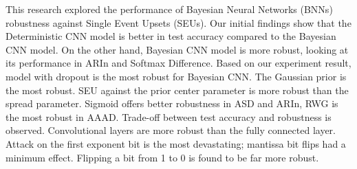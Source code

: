 






This research explored the performance of Bayesian Neural Networks (BNNs) robustness against Single Event Upsets (SEUs). Our initial findings show that the Deterministic CNN model is better in test accuracy compared to the Bayesian CNN model. On the other hand, Bayesian CNN model is more robust, looking at its performance in ARIn and Softmax Difference. Based on our experiment result, model with dropout is the most robust for Bayesian CNN. The Gaussian prior is the most robust. SEU against the prior center parameter is more robust than the spread parameter. Sigmoid offers better robustness in ASD and ARIn, RWG is the most robust in AAAD. Trade-off between test accuracy and robustness is observed. Convolutional layers are more robust than the fully connected layer. Attack on the first exponent bit is the most devastating; mantissa bit flips had a minimum effect. Flipping a bit from 1 to 0 is found to be far more robust.

